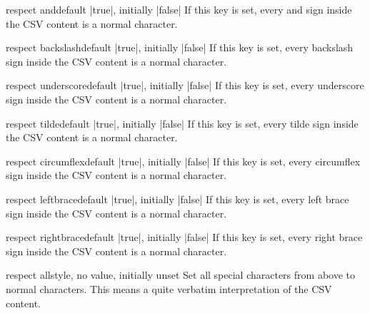 \documentclass[a4paper,11pt]{ltxdoc}
\begin{document}
\begin{docCsvKey}{respect and}{}{default |true|, initially |false|}
  If this key is set, every
  and sign \verbbox{\&}
  inside the CSV content is a normal character.
\end{docCsvKey}

\begin{docCsvKey}{respect backslash}{}{default |true|, initially |false|}
  If this key is set, every
  backslash sign \verbbox{\textbackslash}
  inside the CSV content is a normal character.
\end{docCsvKey}

\begin{docCsvKey}{respect underscore}{}{default |true|, initially |false|}
  If this key is set, every
  underscore sign \verbbox{\_}
  inside the CSV content is a normal character.
\end{docCsvKey}

\begin{docCsvKey}{respect tilde}{}{default |true|, initially |false|}
  If this key is set, every
  tilde sign \verbbox{\textasciitilde}
  inside the CSV content is a normal character.
\end{docCsvKey}

\begin{docCsvKey}{respect circumflex}{}{default |true|, initially |false|}
  If this key is set, every
  circumflex sign \verbbox{\textasciicircum}
  inside the CSV content is a normal character.
\end{docCsvKey}

\begin{docCsvKey}{respect leftbrace}{}{default |true|, initially |false|}
  If this key is set, every
  left brace sign \verbbox{\textbraceleft}
  inside the CSV content is a normal character.
\end{docCsvKey}

\begin{docCsvKey}{respect rightbrace}{}{default |true|, initially |false|}
  If this key is set, every
  right brace sign \verbbox{\textbraceright}
  inside the CSV content is a normal character.
\end{docCsvKey}

\begin{docCsvKey}{respect all}{}{style, no value, initially unset}
  Set all special characters from above to normal characters. This means
  a quite verbatim interpretation of the CSV content.
\end{docCsvKey}
\end{document}
